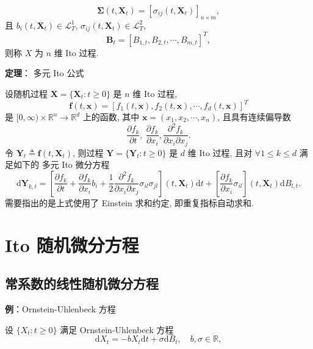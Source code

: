 \documentclass[openany]{ctexbook}
\theoremstyle{kaiti}
\theoremstyle{normal}
\begin{document}
\begin{equation}
  \bm{\Sigma}(t,\bm{X}_t)=[\sigma_{ij}(t,\bm{X}_t)]_{n\times m},
\end{equation}
 且 $b_i(t,\bm{X}_t)\in\mathcal{L}_T^1$, $\sigma_{ij}(t,\bm{X}_t)\in\mathcal{L}_T^2$,
\begin{equation}
  \bm{B}_t=\left[B_{1,t},B_{2,t},\cdots,B_{m,t}\right]^T,
\end{equation}
 则称 $X$ 为 $n$ 维 Ito 过程.

\textbf{定理}： 多元 Ito 公式

设随机过程 $\bm{X}=\{\bm{X}_t:t\geqslant0\}$ 是 $n$ 维 Ito 过程,
\begin{equation}
  \bm{f}(t,\bm{x})=[f_1(t,\bm{x}),f_2(t,\bm{x}),\cdots,f_d(t,\bm{x})]^T
\end{equation}
 是 $[0,\infty)\times\mathbb{R}^n\to\mathbb{R}^d$ 上的函数, 其中 $\bm{x}=(x_1,x_2,\cdots,x_n)$, 且具有连续偏导数
\begin{equation}
  \frac{\partial f_k}{\partial t},~\frac{\partial f_k}{\partial x_i},\frac{\partial^2 f_k}{\partial x_i\partial x_j}.
\end{equation}
 令 $\bm{Y}_t\triangleq \bm{f}(t,\bm{X}_t)$, 则过程 $\bm{Y}=\{\bm{Y}_t:t\geqslant0\}$ 是 $d$ 维 Ito 过程, 且对 $\forall 1\leqslant k\leqslant d$ 满足如下的 多元 Ito 微分方程
\begin{equation}
  \mathrm{d}\bm{Y}_{k,t}=\left[\frac{\partial f_k}{\partial t}+\frac{\partial f_k}{\partial x_i}b_i+\frac{1}{2}\frac{\partial^2 f_k}{\partial x_i\partial x_j}\sigma_{il}\sigma_{jl}\right](t,\bm{X}_t)\mathrm{d}t+\left[\frac{\partial f_k}{\partial x_i}\sigma_{il}\right](t,\bm{X}_t)\mathrm{d}B_{l,t}.
\end{equation}
 需要指出的是上式使用了 Einstein 求和约定, 即重复指标自动求和.

\section{Ito 随机微分方程}

\subsection{常系数的线性随机微分方程}

\textbf{例}：Ornstein-Uhlenbeck 方程

设 $\{X_t:t\geqslant0\}$ 满足 Ornstein-Uhlenbeck 方程
\begin{equation}
  \mathrm{d}X_t=-b X_t\mathrm{d}t+\sigma\mathrm{d}B_t,\quad b,\sigma\in\mathbb{R},
\end{equation}
\end{document}
